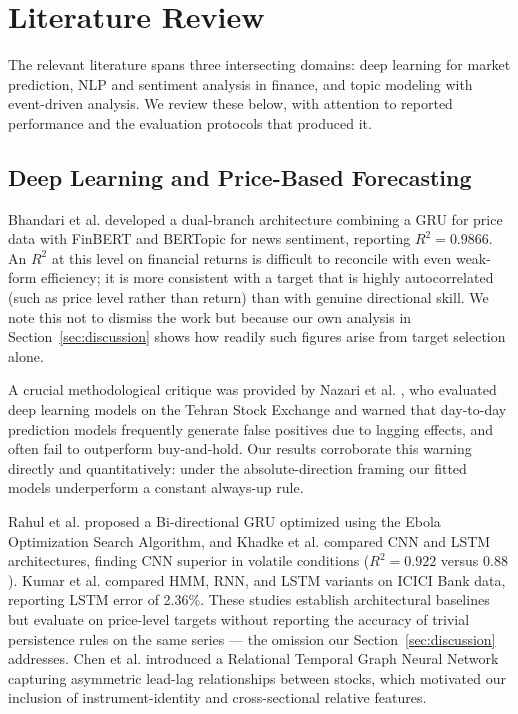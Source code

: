 \documentclass[11pt]{article}
\begin{document}
\section{Literature Review}
\label{sec:litreview}

The relevant literature spans three intersecting domains: deep learning for market prediction, NLP and sentiment analysis in finance, and topic modeling with event-driven analysis. We review these below, with attention to reported performance and the evaluation protocols that produced it.

\subsection{Deep Learning and Price-Based Forecasting}

Bhandari et al. \cite{bhandari2025} developed a dual-branch architecture combining a GRU for price data with FinBERT and BERTopic for news sentiment, reporting $R^2 = 0.9866$. An $R^2$ at this level on financial returns is difficult to reconcile with even weak-form efficiency; it is more consistent with a target that is highly autocorrelated (such as price level rather than return) than with genuine directional skill. We note this not to dismiss the work but because our own analysis in Section~\ref{sec:discussion} shows how readily such figures arise from target selection alone.

A crucial methodological critique was provided by Nazari et al. \cite{nazari2025}, who evaluated deep learning models on the Tehran Stock Exchange and warned that day-to-day prediction models frequently generate false positives due to lagging effects, and often fail to outperform buy-and-hold. Our results corroborate this warning directly and quantitatively: under the absolute-direction framing our fitted models underperform a constant always-up rule.

Rahul et al. \cite{rahul2025} proposed a Bi-directional GRU optimized using the Ebola Optimization Search Algorithm, and Khadke et al. \cite{khadke2023} compared CNN and LSTM architectures, finding CNN superior in volatile conditions ($R^2 = 0.922$ versus $0.88$). Kumar et al. \cite{kumar2024} compared HMM, RNN, and LSTM variants on ICICI Bank data, reporting LSTM error of 2.36\%. These studies establish architectural baselines but evaluate on price-level targets without reporting the accuracy of trivial persistence rules on the same series --- the omission our Section~\ref{sec:discussion} addresses. Chen et al. \cite{chen2024} introduced a Relational Temporal Graph Neural Network capturing asymmetric lead-lag relationships between stocks, which motivated our inclusion of instrument-identity and cross-sectional relative features.
\end{document}
